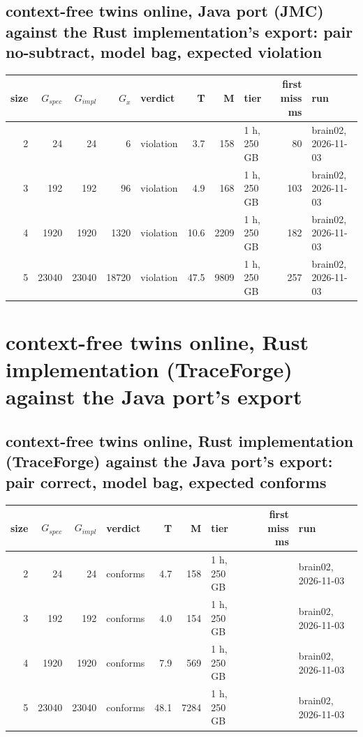 \documentclass[10pt]{article}
\begin{document}
\subsection*{context-free twins online, Java port (JMC) against the Rust implementation's export: pair \textsf{no-subtract}, model bag, expected violation}
\begin{longtable}{@{}rrrrlrrlrl@{}}
\toprule
size & $G_{\mathit{spec}}$ & $G_{\mathit{impl}}$ & $G_x$ & verdict & T & M & tier & first miss ms & run \\
\midrule
\endhead
\color{red} 2 & 24 & 24 & 6 & violation & 3.7 & 158 & 1 h, 250 GB & 80 & brain02, 2026-11-03 \\
\color{red} 3 & 192 & 192 & 96 & violation & 4.9 & 168 & 1 h, 250 GB & 103 & brain02, 2026-11-03 \\
\color{red} 4 & 1920 & 1920 & 1320 & violation & 10.6 & 2209 & 1 h, 250 GB & 182 & brain02, 2026-11-03 \\
\color{red} 5 & 23040 & 23040 & 18720 & violation & 47.5 & 9809 & 1 h, 250 GB & 257 & brain02, 2026-11-03 \\
\bottomrule
\end{longtable}
\section*{context-free twins online, Rust implementation (TraceForge) against the Java port's export}
\subsection*{context-free twins online, Rust implementation (TraceForge) against the Java port's export: pair \textsf{correct}, model bag, expected conforms}
\begin{longtable}{@{}rrrlrrlrl@{}}
\toprule
size & $G_{\mathit{spec}}$ & $G_{\mathit{impl}}$ & verdict & T & M & tier & first miss ms & run \\
\midrule
\endhead
\color{red} 2 & 24 & 24 & conforms & 4.7 & 158 & 1 h, 250 GB &  & brain02, 2026-11-03 \\
\color{red} 3 & 192 & 192 & conforms & 4.0 & 154 & 1 h, 250 GB &  & brain02, 2026-11-03 \\
\color{red} 4 & 1920 & 1920 & conforms & 7.9 & 569 & 1 h, 250 GB &  & brain02, 2026-11-03 \\
\color{red} 5 & 23040 & 23040 & conforms & 48.1 & 7284 & 1 h, 250 GB &  & brain02, 2026-11-03 \\
\bottomrule
\end{longtable}
\end{document}
